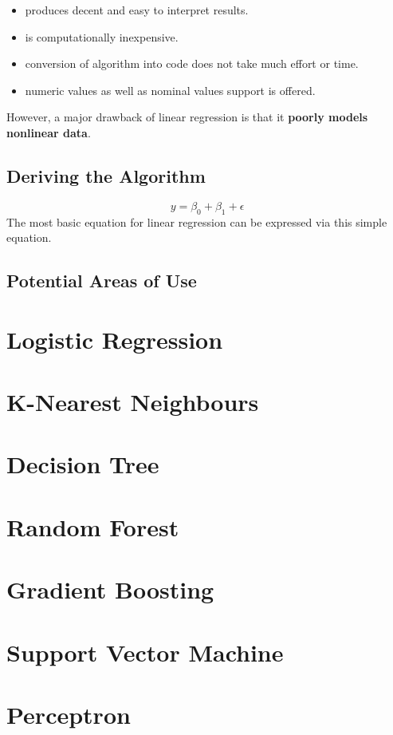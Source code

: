 \documentclass[12pt]{article}
\begin{document}
\begin{itemize}
  \item produces decent and  easy to interpret results.
  \item is computationally inexpensive.
  \item conversion of algorithm into code does not take much effort or time.
  \item numeric values as well as nominal values support is offered.
\end{itemize}

However, a major drawback of linear regression is that it \textbf{poorly models nonlinear data}.
\subsection{Deriving the Algorithm}

\begin{equation}
y = \beta_{0}+\beta_{1}+\epsilon
\end{equation}
The most basic equation for linear regression can be expressed via this simple equation.
\subsection{Potential Areas of Use}
\newpage
\section{Logistic Regression}
\newpage
\section{K-Nearest Neighbours}
\newpage
\section{Decision Tree}
\newpage
\section{Random Forest}
\newpage
\section{Gradient Boosting}
\newpage
\section{Support Vector Machine}
\newpage
\section{Perceptron}
\newpage
\end{document}
